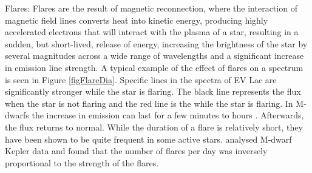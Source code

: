 \begin{figure}
    \captionsetup{width=.45\textwidth}
    \caption{}
    \label{figStellActiv}
\end{figure}

Flares: Flares are the result of magnetic reconnection, where the interaction of magnetic field lines converts heat into kinetic energy, producing highly accelerated electrons that will interact with the plasma of a star, resulting in a sudden, but short-lived, release of energy, increasing the brightness of the star by several magnitudes across a wide range of wavelengths \citep{2012Schmidt} and a significant increase in emission line strength. A typical example of the effect of flares on a spectrum is seen in Figure \ref{figFlareDia}. Specific lines in the spectra of EV Lac are significantly stronger while the star is flaring. The black line represents the flux when the star is not flaring and the red line is the while the star is flaring. In M-dwarfs the increase in emission can last for a few minutes to hours \citep{2011Hilton}. Afterwards, the flux returns to normal. While the duration of a flare is relatively short, they have been shown to be quite frequent in some active stars. \citet{2014Hawley} analysed M-dwarf Kepler data and found that the number of flares per day was inversely proportional to the strength of the flares.\\

